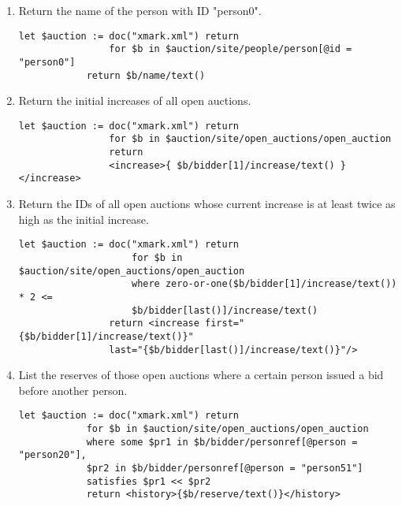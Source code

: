\label{xmark-queries}
	\begin{enumerate}[label=Q\arabic*.]
		\paragraph{exact Match}
		\item %
			Return the name of the person with ID "person0". 
		\begin{lstlisting}[style=XQuery]
			let $auction := doc("xmark.xml") return
				for $b in $auction/site/people/person[@id = "person0"]
			return $b/name/text()
		\end{lstlisting}
		\item %
			Return the initial increases of all open auctions.
		\begin{lstlisting}[style=XQuery]
			let $auction := doc("xmark.xml") return
    			for $b in $auction/site/open_auctions/open_auction
    			return
                <increase>{ $b/bidder[1]/increase/text() }</increase>
		\end{lstlisting}
		\item %
			Return the IDs of all open auctions whose current increase is at least twice as high as the initial increase. 
			\begin{lstlisting}[style=XQuery]
				let $auction := doc("xmark.xml") return
					for $b in $auction/site/open_auctions/open_auction
					where zero-or-one($b/bidder[1]/increase/text()) * 2 <=
					$b/bidder[last()]/increase/text()
				return <increase first="{$b/bidder[1]/increase/text()}"
				last="{$b/bidder[last()]/increase/text()}"/>
			\end{lstlisting}	
		
		\item %
			List the reserves of those open auctions where a certain person issued a bid before another person.
			\begin{lstlisting}[style=XQuery]
			let $auction := doc("xmark.xml") return
			for $b in $auction/site/open_auctions/open_auction
			where some $pr1 in $b/bidder/personref[@person = "person20"],
			$pr2 in $b/bidder/personref[@person = "person51"]
			satisfies $pr1 << $pr2
			return <history>{$b/reserve/text()}</history>
			\end{lstlisting}	
		

\end{enumerate}
